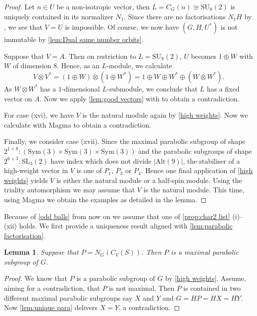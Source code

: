 \documentclass[12pt]{amsart}
\newtheorem{lemma}[theorem]{Lemma}
\theoremstyle{remark}
\theoremstyle{notation}
\theoremstyle{definition}
\newcommand{\SU}{\mathrm{SU}}
\newcommand{\SL}{\mathrm{SL}}
\newcommand{\0}{\emptyset}
\newcommand{\Sym}{\mathrm{Sym}}
\newcommand{\Alt}{\mathrm{Alt}}
\begin{document}
\begin{proof}
 Let $n \in U$ be a non-isotropic vector, then $L=C_G(n) \cong \SU_8(2)$ is uniquely contained in its normalizer $N_1$.  Since there are no factorisations $N_1H$ by  \cite[Theorem A, Tables 1, 2 \& 3]{LiebeckPraegerSaxl}, we see that $V= U$ is impossible.  Of course, we now have $(G,H,U^*)$ is not immutable by  \cref{lem:Dual same number orbits}.


 Suppose that $V= A$. Then on restriction to $L=\SU_8(2)$, $U$ becomes $1\oplus W$ with $W$ of dimension $8$. Hence, as an $L$-module, we calculate $$V\otimes V^*= (1\oplus W)\otimes (1\oplus W^*) = 1\oplus W\oplus W^* \oplus   ( W\otimes W^*).$$  As $W\otimes W^*$  has a $1$-dimensional $L$-submodule, we conclude that $L$ has a fixed vector on $A$.
 Now we apply \cref{lem:good vectors} with \cite[Theorem A, Tables 1, 2 \& 3]{LiebeckPraegerSaxl} to obtain a contradiction.


For case (xvi), we have  $V$ is the natural module again by \cref{high weights}. Now we calculate with {\sc Magma} to obtain a contradiction.

Finally, we consider  case (xvii). Since the maximal parabolic subgroup of shape $2^{1+8}{:}(\Sym(3)\times \Sym(3) \times \Sym(3))$ and the parabolic subgroups of shape $2^{6+3}{:}\SL_3(2)$ have index which does not divide $|\Alt(9)|$, the stabiliser of a high-weight vector in $V$ is one of $P_1$, $P_3$ or $P_4$. Hence one final application of \cref{high weights} yields $V$ is either the natural module or a half-spin module. Using the triality automorphism we may assume that $V$ is the natural module. This time, using {\sc Magma}  we obtain the examples as detailed in the lemma.
\end{proof}



  Because of \cref{odd balls} from now on we assume that one of \cref{prop:char2 list} (i)--(xii) holds.
We first provide a uniqueness result aligned with \cref{lem:parabolic factorisation}.




\begin{lemma}\label{unique para}
Suppose that $P=N_G(C_V(S))$. Then $P$ is a maximal parabolic subgroup of  $G$.
\end{lemma}

\begin{proof}
We know that $P$ is a parabolic subgroup of $G$ by \cref{high weights}. Assume, aiming for a contradiction,  that $P$ is not maximal.  Then $P$ is contained in two different maximal parabolic subgroups say $X$ and $Y$ and $G=HP=HX=HY$. Now \cref{lem:unique para} delivers $X=Y$, a contradiction.
\end{proof}
\end{document}
